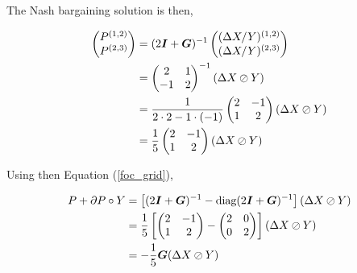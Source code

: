 The Nash bargaining solution is then,

\begin{equation*}
    \begin{split}
        \begin{pmatrix}
            P^{(1, 2)} \\
            P^{(2, 3)}
        \end{pmatrix} &= (2\bm{I} + \bm{G})^{-1} \begin{pmatrix}
            (\Delta X / Y)^{(1, 2)} \\
            (\Delta X / Y)^{(2, 3)}
        \end{pmatrix} \\
        &= \begin{pmatrix}
            2  & 1 \\
            -1 & 2
        \end{pmatrix}^{-1} (\Delta X \oslash Y)\\
        &= \frac{1}{2 \cdot 2 - 1 \cdot (-1)} \begin{pmatrix}
            2 & - 1 \\
            1 & 2
        \end{pmatrix} (\Delta X \oslash Y) \\
        &= \frac{1}{5} \begin{pmatrix}
            2 & - 1 \\
            1 & 2
        \end{pmatrix} (\Delta X \oslash Y)
    \end{split}
\end{equation*}


Using then Equation (\ref{foc_grid}),

\begin{equation}
    \begin{split}
        P + \partial P \circ Y &= \left[ (2 \bm{I} + \bm{G})^{-1} - \text{diag}(2 \bm{I} + \bm{G})^{-1}  \right] (\Delta X \oslash Y) \\
        &= \frac{1}{5} \left[ \begin{pmatrix}
                2 & - 1 \\
                1 & 2
            \end{pmatrix} -  \begin{pmatrix}
                2 & 0 \\
                0 & 2
            \end{pmatrix}\right] (\Delta X \oslash Y) \\
        &= -\frac{1}{5} \bm{G} (\Delta X \oslash Y)
    \end{split}
\end{equation}

